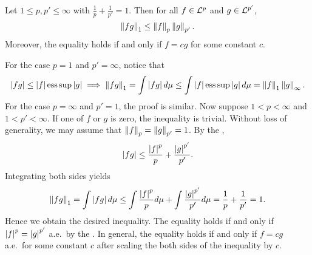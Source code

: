 \begin{theorem}
    Let $1\leq p,p'\leq\infty$ with $\frac{1}{p}+\frac{1}{p'}=1$. 
    Then for all $f\in\mathcal{L}^p$ and $g\in\mathcal{L}^{p'}$, 
    \begin{equation*}
        \left\lVert {fg} \right\rVert_1 \leq \left\lVert {f} \right\rVert_p\left\lVert {g} \right\rVert_{p'}.
    \end{equation*}
    Moreover, the equality holds if and only if $f = cg$ for some 
    constant $c$.
\end{theorem}
\begin{pf}
    For the case $p = 1$ and $p' = \infty$, notice that
    \begin{equation*}
        \left\lvert {fg} \right\rvert \leq \left\lvert {f} \right\rvert\operatorname{ess\,sup} \left\lvert {g} \right\rvert \implies 
        \left\lVert {fg} \right\rVert_1 = \int \left\lvert {fg} \right\rvert d\mu \leq \int \left\lvert {f} \right\rvert\operatorname{ess\,sup}\left\lvert {g} \right\rvert d\mu = \left\lVert {f} \right\rVert_1\left\lVert {g} \right\rVert_\infty.
    \end{equation*}
    For the case $p = \infty$ and $p' = 1$, the proof is similar. 
    Now suppose $1<p<\infty$ and $1<p'<\infty$. If one of $f$ or 
    $g$ is zero, the inequality is trivial. Without loss of 
    generality, we may assume that $\left\lVert {f} \right\rVert_p = \left\lVert {g} \right\rVert_{p'} = 1$. 
    By the , 
    \begin{equation*}
        \left\lvert {fg} \right\rvert \leq \frac{\left\lvert {f} \right\rvert^p}{p} + \frac{\left\lvert {g} \right\rvert^{p'}}{p'}.
    \end{equation*}
    Integrating both sides yields
    \begin{equation*}
        \left\lVert {fg} \right\rVert_1 = \int \left\lvert {fg} \right\rvert d\mu \leq \int \frac{\left\lvert {f} \right\rvert^p}{p}d\mu + \int \frac{\left\lvert {g} \right\rvert^{p'}}{p'}d\mu 
        = \frac{1}{p} + \frac{1}{p'} = 1.
    \end{equation*}
    Hence we obtain the desired inequality. The equality holds if 
    and only if $\left\lvert {f} \right\rvert^p = \left\lvert {g} \right\rvert^{p'}$ a.e.\ by the . 
    In general, the equality holds if and only if $f = cg$ a.e.\ for some 
    constant $c$ after scaling the both sides of the inequality by $c$.
\end{pf}